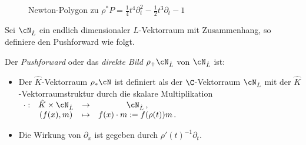 \begin{exmp}
\begin{figure}[htbp]
\begin{minipage}[hbt]{0,49\textwidth}
\begin{center}
  \end{center}
  \caption[Newton-Polygon zu $\rho^*P=%
    \frac{1}{4}t^4\partial_t^2-\frac{1}{2}t^3\partial_t-1$]
    {Newton-Polygon zu \newline $\rho^*P=%
    \frac{1}{4}t^4\partial_t^2-\frac{1}{2}t^3\partial_t-1$}
  \label{fig:Pull-Back2}
  \end{minipage}
\end{figure}
\end{exmp}

Sei $\cN_{\hat L}$ ein endlich dimensionaler $\hat L$-Vektorraum mit
Zusammenhang, so definiere den Pushforward wie folgt.
\begin{comment}
TODO: korregieren, besser formulieren
\end{comment}
\begin{defn}[Pushforward]
Der \emph{Pushforward} oder das \emph{direkte Bild} $\rho_+\cN_{\hat L}$ von
$\cN_{\hat L}$ ist:
\begin{itemize}
\item Der $\hat K$-Vektorraum $\rho_*\cN$ ist definiert als der $\C$-Vektorraum
$\cN_{\hat L}$ mit der $\hat K$-Vektorraumstruktur durch
die skalare Multiplikation
$\begin{array}[t]{cccc}
\cdot: & \hat{K}\times\cN_{\hat{L}} & \rightarrow & \cN_{\hat{L}}\,,\\
 & (f(x),m) & \mapsto & f(x)\cdot m:=f(\rho(t))m \,.
\end{array}$
\item Die Wirkung von $\partial_x$ ist gegeben durch $\rho'(t)^{-1}\partial_t$.
\end{itemize}
\end{defn}


